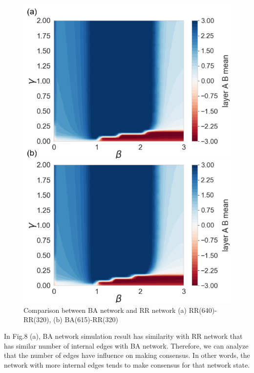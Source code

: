 \documentclass[english]{cccconf}
\begin{document}
\begin{figure}[!htb]
  \centering
  \includegraphics[width=\hsize]{FIG8.png}
  \caption{Comparison between BA network and RR network (a) RR(640)-RR(320), (b) BA(615)-RR(320)}
  \label{Fig8}
\end{figure}
In Fig.8 (a), BA network simulation result has similarity with RR network that has similar number of internal edges with BA network. Therefore, we can analyze that the number of edges have influence on making consensus. In other words, the network with more internal edges tends to make consensus for that network state.
\end{document}

